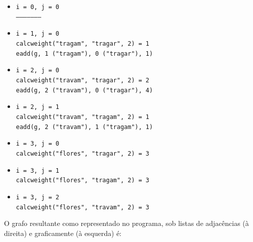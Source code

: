 \documentclass[a4paper, 18pt]{article}
\begin{document}
	\begin{itemize}
		\item
			\texttt{i = 0, j = 0} \\
			\texttt{---------------------}
		\item
			\texttt{i = 1, j = 0} \\
			\texttt{calc\textunderscore weight("tragam", "tragar", 2) = 1} \\
			\texttt{e\textunderscore add(g, 1 ("tragam"), 0 ("tragar"), 1)}
		\item
			\texttt{i = 2, j = 0} \\
			\texttt{calc\textunderscore weight("travam", "tragar", 2) = 2} \\
			\texttt{e\textunderscore add(g, 2 ("travam"), 0 ("tragar"), 4)}
		\item
			\texttt{i = 2, j = 1} \\
			\texttt{calc\textunderscore weight("travam", "tragam", 2) = 1} \\
			\texttt{e\textunderscore add(g, 2 ("travam"), 1 ("tragam"), 1)}
		\item
			\texttt{i = 3, j = 0} \\
			\texttt{calc\textunderscore weight("flores", "tragar", 2) = 3}
		\item
			\texttt{i = 3, j = 1} \\
			\texttt{calc\textunderscore weight("flores", "tragam", 2) = 3}
		\item
			\texttt{i = 3, j = 2} \\
			\texttt{calc\textunderscore weight("flores", "travam", 2) = 3}
	\end{itemize}
	\par
	O grafo resultante como representado no programa, sob listas de adjacências (à direita) e graficamente (à esquerda) é: \\
\end{document}
